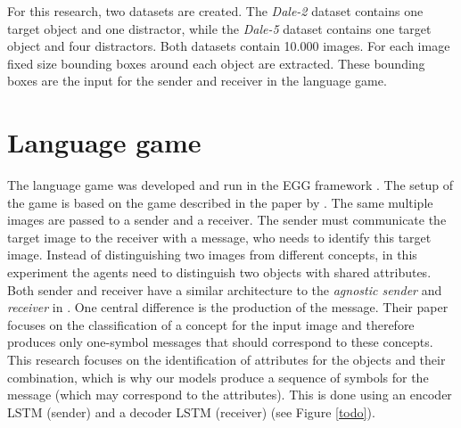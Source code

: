 \documentclass[11pt]{article}
\begin{document}
For this research, two datasets are created.
The \emph{Dale-2} dataset contains one target object and one distractor, while the \emph{Dale-5} dataset contains one target object and four distractors.
Both datasets contain 10.000 images.
For each image fixed size bounding boxes around each object are extracted.
These bounding boxes are the input for the sender and receiver in the language game.


\section{Language game}
The language game was developed and run in the EGG framework \citep{Kharitonov2019}.
The setup of the game is based on the game described in the paper by \citet{Lazaridou2016}.
The same multiple images are passed to a sender and a receiver.
The sender must communicate the target image to the receiver with a message, who needs to identify this target image.
Instead of distinguishing two images from different concepts, in this experiment the agents need to distinguish two objects with shared attributes.
Both sender and receiver have a similar architecture to the \emph{agnostic sender} and \emph{receiver} in \citet{Lazaridou2016}.
One central difference is the production of the message.
Their paper focuses on the classification of a concept for the input image and therefore produces only one-symbol messages that should correspond to these concepts.
This research focuses on the identification of attributes for the objects and their combination, which is why our models produce a sequence of symbols for the message (which may correspond to the attributes).
This is done using an encoder LSTM (sender) and a decoder LSTM (receiver) (see Figure \ref*{todo}).

\end{document}
